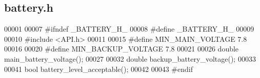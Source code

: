 \subsection{battery.\+h}
\label{a00005_source}

\begin{DoxyCode}
00001 
00007 \textcolor{preprocessor}{#ifndef \_BATTERY\_H\_}
00008 \textcolor{preprocessor}{#define \_BATTERY\_H\_}
00009 
00010 \textcolor{preprocessor}{#include <API.h>}
00011 
00015 \textcolor{preprocessor}{#define MIN\_MAIN\_VOLTAGE 7.8}
00016 
00020 \textcolor{preprocessor}{#define MIN\_BACKUP\_VOLTAGE 7.8}
00021 
00026 \textcolor{keywordtype}{double} main_battery_voltage();
00027 
00032 \textcolor{keywordtype}{double} backup_battery_voltage();
00033 
00041 \textcolor{keywordtype}{bool} battery_level_acceptable();
00042 
00043 \textcolor{preprocessor}{#endif}
\end{DoxyCode}
